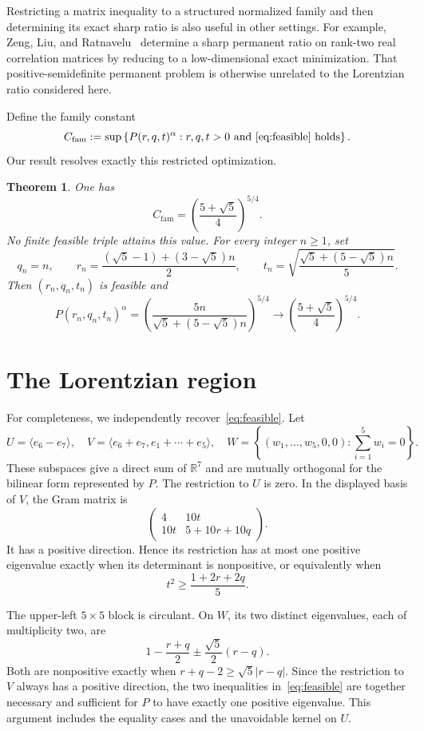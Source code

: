 \documentclass[11pt]{article}
\newtheorem{theorem}{Theorem}
\newcommand{\R}{\mathbb{R}}
\begin{document}
Restricting a matrix inequality to a structured normalized family and then
determining its exact sharp ratio is also useful in other settings.  For
example, Zeng, Liu, and Ratnavelu~\cite{ZengEtAl2026} determine a sharp
permanent ratio on rank-two real correlation matrices by reducing to a
low-dimensional exact minimization.  That positive-semidefinite permanent
problem is otherwise unrelated to the Lorentzian ratio considered here.

Define the family constant
\[
 C_{\mathrm{fam}}
 :=\sup\left\{P(r,q,t)^\alpha:
 r,q,t>0\ \text{and \eqref{eq:feasible} holds}\right\}.
\]
Our result resolves exactly this restricted optimization.

\begin{theorem}\label{thm:main}
One has
\[
 C_{\mathrm{fam}}=\left(\frac{5+\sqrt5}{4}\right)^{5/4}.
\]
No finite feasible triple attains this value.  For every integer \(n\geq1\),
set
\begin{equation}\label{eq:sequence}
 q_n=n,\qquad
 r_n=\frac{(\sqrt5-1)+(3-\sqrt5)n}{2},\qquad
 t_n=\sqrt{\frac{\sqrt5+(5-\sqrt5)n}{5}}.
\end{equation}
Then \((r_n,q_n,t_n)\) is feasible and
\[
 P(r_n,q_n,t_n)^\alpha
 =\left(\frac{5n}{\sqrt5+(5-\sqrt5)n}\right)^{5/4}
 \longrightarrow
 \left(\frac{5+\sqrt5}{4}\right)^{5/4}.
\]
\end{theorem}

\section{The Lorentzian region}

For completeness, we independently recover~\eqref{eq:feasible}.  Let
\[
 U=\langle e_6-e_7\rangle,
 \quad
 V=\langle e_6+e_7,e_1+\cdots+e_5\rangle,
 \quad
 W=\left\{(w_1,\ldots,w_5,0,0):\sum_{i=1}^5w_i=0\right\}.
\]
These subspaces give a direct sum of \(\R^7\) and are mutually orthogonal
for the bilinear form represented by \(P\).  The restriction to \(U\) is
zero.  In the displayed basis of \(V\), the Gram matrix is
\[
 \begin{pmatrix}
 4&10t\\
 10t&5+10r+10q
 \end{pmatrix}.
\]
It has a positive direction.  Hence its restriction has at most one positive
eigenvalue exactly when its determinant is nonpositive, or equivalently when
\[
 t^2\geq\frac{1+2r+2q}{5}.
\]

The upper-left \(5\times5\) block is circulant.  On \(W\), its two distinct
eigenvalues, each of multiplicity two, are
\[
 1-\frac{r+q}{2}\mathbin{\pm}\frac{\sqrt5}{2}(r-q).
\]
Both are nonpositive exactly when
\(r+q-2\geq\sqrt5|r-q|\).  Since the restriction to \(V\) always has a
positive direction, the two inequalities in~\eqref{eq:feasible} are together
necessary and sufficient for \(P\) to have exactly one positive eigenvalue.
This argument includes the equality cases and the unavoidable kernel on
\(U\).
\end{document}
